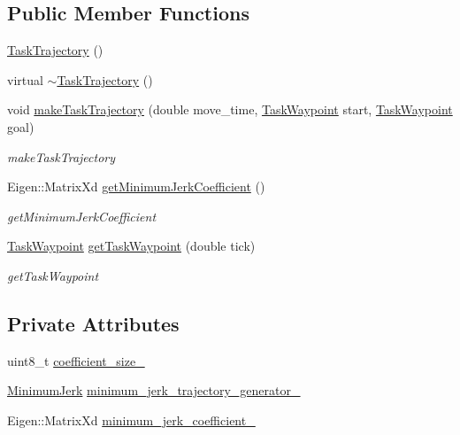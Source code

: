 \subsection*{Public Member Functions}
\begin{DoxyCompactItemize}
\item 
\hyperlink{classrobotis__manipulator_1_1_task_trajectory_ab1cef75c638b80f579f960fad91bf3ba}{Task\+Trajectory} ()
\item 
virtual \hyperlink{classrobotis__manipulator_1_1_task_trajectory_a9746e3b18cce92661b766aca6b6d3add}{$\sim$\+Task\+Trajectory} ()
\item 
void \hyperlink{classrobotis__manipulator_1_1_task_trajectory_a29e0ef8260a659d2ddbda835777690bc}{make\+Task\+Trajectory} (double move\+\_\+time, \hyperlink{namespacerobotis__manipulator_a440e2d88ec85fdee394e540dc6024c3e}{Task\+Waypoint} start, \hyperlink{namespacerobotis__manipulator_a440e2d88ec85fdee394e540dc6024c3e}{Task\+Waypoint} goal)
\begin{DoxyCompactList}\small\item\em make\+Task\+Trajectory \end{DoxyCompactList}\item 
Eigen\+::\+Matrix\+Xd \hyperlink{classrobotis__manipulator_1_1_task_trajectory_ace7f92380218ee5b15f56ec500ae5337}{get\+Minimum\+Jerk\+Coefficient} ()
\begin{DoxyCompactList}\small\item\em get\+Minimum\+Jerk\+Coefficient \end{DoxyCompactList}\item 
\hyperlink{namespacerobotis__manipulator_a440e2d88ec85fdee394e540dc6024c3e}{Task\+Waypoint} \hyperlink{classrobotis__manipulator_1_1_task_trajectory_a10718a16244458b0240ec357acfa09bd}{get\+Task\+Waypoint} (double tick)
\begin{DoxyCompactList}\small\item\em get\+Task\+Waypoint \end{DoxyCompactList}\end{DoxyCompactItemize}
\subsection*{Private Attributes}
\begin{DoxyCompactItemize}
\item 
uint8\+\_\+t \hyperlink{classrobotis__manipulator_1_1_task_trajectory_a3e18bd8e5e8b327d15afd8831ba099f5}{coefficient\+\_\+size\+\_\+}
\item 
\hyperlink{classrobotis__manipulator_1_1_minimum_jerk}{Minimum\+Jerk} \hyperlink{classrobotis__manipulator_1_1_task_trajectory_aa616787d639765003bd054cc7c59f6d3}{minimum\+\_\+jerk\+\_\+trajectory\+\_\+generator\+\_\+}
\item 
Eigen\+::\+Matrix\+Xd \hyperlink{classrobotis__manipulator_1_1_task_trajectory_a19c6e0525c29db0b3bad7950baa74e42}{minimum\+\_\+jerk\+\_\+coefficient\+\_\+}
\end{DoxyCompactItemize}


